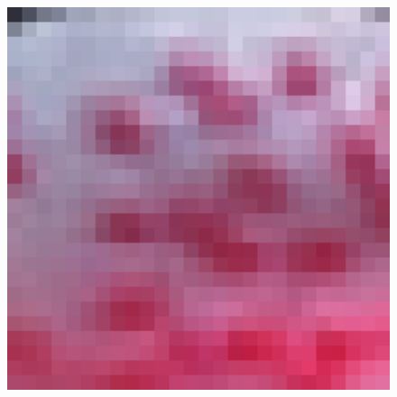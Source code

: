 \documentclass[review,numbers,sort&compress]{elsarticle}  %
\begin{document}
\begin{figure}[htbp]
{\begin{minipage}[b]{0.12\textwidth}
                \includegraphics[width=1\textwidth]{compareImage/OUR_flowers_mag_2.png}
            \end{minipage}
        }
\end{figure}
\end{document}
